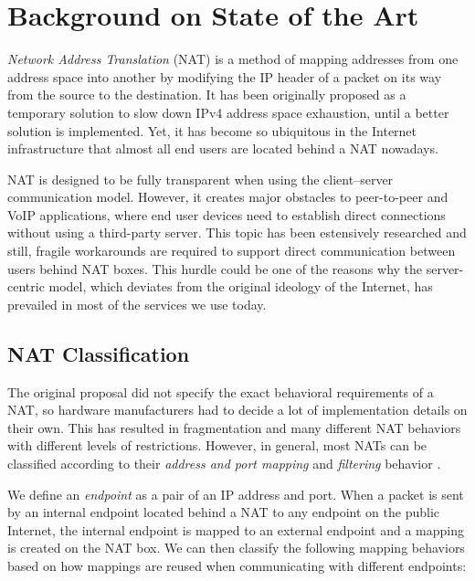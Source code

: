 \section{Background on State of the Art}

\textit{Network Address Translation} (NAT) is a method of mapping addresses from one address space into another by modifying the IP header of a packet on its way from the source to the destination. It has been originally proposed as a temporary solution to slow down IPv4 address space exhaustion, until a better solution is implemented. \cite{nat} Yet, it has become so ubiquitous in the Internet infrastructure that almost all end users are located behind a NAT nowadays.

NAT is designed to be fully transparent when using the client–server communication model. However, it creates major obstacles to peer-to-peer and VoIP applications, where end user devices need to establish direct connections without using a third-party server. This topic has been estensively researched and still, fragile workarounds are required to support direct communication between users behind NAT boxes. This hurdle could be one of the reasons why the server-centric model, which deviates from the original ideology of the Internet, has prevailed in most of the services we use today.

\subsection{NAT Classification}
\label{nat-classification}


The original proposal did not specify the exact behavioral requirements of a NAT, so hardware manufacturers had to decide a lot of implementation details on their own. This has resulted in fragmentation and many different NAT behaviors with different levels of restrictions. However, in general, most NATs can be classified according to their \textit{address and port mapping} and \textit{filtering} behavior \cite{behave}.

We define an \textit{endpoint} as a pair of an IP address and port. When a packet is sent by an internal endpoint located behind a NAT to any endpoint on the public Internet, the internal endpoint is mapped to an external endpoint and a mapping is created on the NAT box. We can then classify the following mapping behaviors based on how mappings are reused when communicating with different endpoints:

